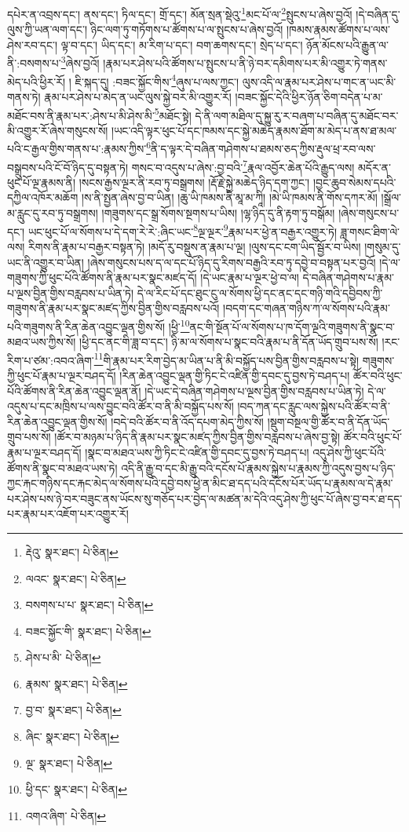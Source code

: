 དཔེར་ན་འབྲས་དང་། ནས་དང་། ཏིལ་དང་། གྲོ་དང་། མོན་སྲན་སྡེའུ་\footnote{རྡེའུ་  སྣར་ཐང་།  པེ་ཅིན། }མང་པོ་ལ་\footnote{ལའང་  སྣར་ཐང་།  པེ་ཅིན། }སྤུངས་པ་ཞེས་བྱའོ། །དེ་བཞིན་དུ་ལུས་ཀྱི་ཡན་ལག་དང་། ཉིང་ལག་ཏུ་གཏོགས་པ་ཚོགས་པ་ལ་སྤུངས་པ་ཞེས་བྱའོ། །ཁམས་རྣམས་ཚོགས་པ་ལས་ཤེས་རབ་དང་། ལྟ་བ་དང་། ཡིད་དང་། མ་རིག་པ་དང་། བག་ཆགས་དང་། སྲེད་པ་དང་། ཉོན་མོངས་པའི་རྒྱུན་ལ་ནི་:བསགས་པ་\footnote{བསགས་པ་པ་  སྣར་ཐང་།  པེ་ཅིན། }ཞེས་བྱའོ། །རྣམ་པར་ཤེས་པའི་ཚོགས་པ་སྤུངས་པ་ནི་ཉེ་བར་དམིགས་པར་མི་འགྱུར་ཏེ་གནས་མེད་པའི་ཕྱིར་རོ། །
ཇི་སྐད་དུ། :བཟང་སྐྱོང་གིས་\footnote{བཟང་སྐྱོང་གི་  སྣར་ཐང་།  པེ་ཅིན། }ཞུས་པ་ལས་ཀྱང་། ལུས་འདི་ལ་རྣམ་པར་ཤེས་པ་གང་ན་ཡང་མི་གནས་ཏེ། རྣམ་པར་ཤེས་པ་མེད་ན་ཡང་ལུས་སྐྱེ་བར་མི་འགྱུར་རོ། །བཟང་སྐྱོང་དེའི་ཕྱིར་ཉོན་ཅིག་བདེན་པ་མ་མཐོང་བས་ནི་རྣམ་པར་:ཤེས་པ་མི་ཤེས་མི་\footnote{ཤེས་པ་མི་  པེ་ཅིན། }མཐོང་སྟེ། དེ་ནི་ལག་མཐིལ་དུ་སྐྱུ་རུ་ར་བཞག་པ་བཞིན་དུ་མཐོང་བར་མི་འགྱུར་རོ་ཞེས་གསུངས་སོ། །ཡང་འདི་ལྟར་ཕུང་པོ་དང་ཁམས་དང་སྐྱེ་མཆེད་རྣམས་ཐོག་མ་མེད་པ་ནས་ཐ་མལ་པའི་ང་རྒྱལ་གྱིས་གནས་པ་:རྣམས་ཀྱིས་\footnote{རྣམས་  སྣར་ཐང་།  པེ་ཅིན། }ནི་ད་ལྟར་དེ་བཞིན་གཤེགས་པ་ཐམས་ཅད་ཀྱིས་རྡུལ་ཕྲ་རབ་ལས་བསྒྲུབས་པའི་ངོ་བོ་ཉིད་དུ་བསྟན་ཏེ། གསང་བ་འདུས་པ་ཞེས་:བྱ་བའི་\footnote{བྱ་བ་  སྣར་ཐང་།  པེ་ཅིན། }རྣལ་འབྱོར་ཆེན་པོའི་རྒྱུད་ལས། མདོར་ན་ཕུང་པོ་ལྔ་རྣམས་ནི། །སངས་རྒྱས་ལྔར་ནི་རབ་ཏུ་བསྒྲགས། །རྡོ་རྗེ་སྐྱེ་མཆེད་ཉིད་དག་ཀྱང་། །བྱང་ཆུབ་སེམས་དཔའི་དཀྱིལ་འཁོར་མཆོག །ས་ནི་སྤྱན་ཞེས་བྱ་བ་ཡིན། །ཆུ་ཡི་ཁམས་ནི་མཱ་མ་ཀཱི། །མེ་ཡི་ཁམས་ནི་གོས་དཀར་མོ། །སྒྲོལ་མ་རླུང་དུ་རབ་ཏུ་བསྒྲགས། །གཟུགས་དང་སྒྲ་སོགས་སྔགས་པ་ཡིས། །ལྷ་ཉིད་དུ་ནི་རྟག་ཏུ་བསྒོམ། །ཞེས་གསུངས་པ་དང་། ཡང་ཕུང་པོ་ལ་སོགས་པ་དེ་དག་རེ་རེ་:ཞིང་ཡང་\footnote{ཞིང་  སྣར་ཐང་།  པེ་ཅིན། }ལྔ་ལྔར་\footnote{ལྔ་  སྣར་ཐང་།  པེ་ཅིན། }རྣམ་པར་ཕྱེ་ན་བརྒྱར་འགྱུར་ཏེ། ཟླ་གསང་ཐིག་ལེ་ལས། རིགས་ནི་རྣམ་པ་བརྒྱར་བསྟན་ཏེ། །མདོ་རུ་བསྡུས་ན་རྣམ་པ་ལྔ། །ལུས་དང་ངག་ཡིད་སྦྱོར་བ་ཡིས། །གསུམ་དུ་ཡང་ནི་འགྱུར་བ་ཡིན། །ཞེས་གསུངས་པས་ད་ལ་དང་པོ་ཉིད་དུ་རིགས་བརྒྱའི་རབ་ཏུ་དབྱེ་བ་བསྟན་པར་བྱའོ། །དེ་ལ་གཟུགས་ཀྱི་ཕུང་པོའི་ཚོགས་ནི་རྣམ་པར་སྣང་མཛད་དོ། །དེ་ཡང་རྣམ་པ་ལྔར་ཕྱེ་བ་ལ། དེ་བཞིན་གཤེགས་པ་རྣམ་པ་ལྔས་བྱིན་གྱིས་བརླབས་པ་ཡིན་ཏེ། དེ་ལ་རིང་པོ་དང་ཐུང་ངུ་ལ་སོགས་ཕྱི་དང་ནང་དང་གཉི་གའི་དབྱིབས་ཀྱི་གཟུགས་ནི་རྣམ་པར་སྣང་མཛད་ཀྱིས་བྱིན་གྱིས་བརླབས་པའོ། །བདག་དང་གཞན་གཉིས་ཀ་ལ་སོགས་པའི་རྣམ་པའི་གཟུགས་ནི་རིན་ཆེན་འབྱུང་ལྡན་གྱིས་སོ། །ཕྱི་\footnote{ཕྱི་དང་  སྣར་ཐང་།  པེ་ཅིན། }ནང་གི་སྔོན་པོ་ལ་སོགས་པ་ཁ་དོག་ལྔའི་གཟུགས་ནི་སྣང་བ་མཐའ་ཡས་ཀྱིས་སོ། །ཕྱི་དང་ནང་གི་ཟླ་བ་དང་། ཉི་མ་ལ་སོགས་པ་སྣང་བའི་རྣམ་པ་ནི་དོན་ཡོད་གྲུབ་པས་སོ། །རང་རིག་པ་ཙམ་:འབའ་ཞིག་\footnote{འགའ་ཞིག་  པེ་ཅིན། }གི་རྣམ་པར་རིག་བྱེད་མ་ཡིན་པ་ནི་མི་བསྐྱོད་པས་བྱིན་གྱིས་བརླབས་པ་སྟེ། གཟུགས་ཀྱི་ཕུང་པོ་རྣམ་པ་ལྔར་བཤད་དོ། །རིན་ཆེན་འབྱུང་ལྡན་གྱི་ཏིང་ངེ་འཛིན་གྱི་དབང་དུ་བྱས་ཏེ་བཤད་པ། ཚོར་བའི་ཕུང་པོའི་ཚོགས་ནི་རིན་ཆེན་འབྱུང་ལྡན་ནོ། །དེ་ཡང་དེ་བཞིན་གཤེགས་པ་ལྔས་བྱིན་གྱིས་བརླབས་པ་ཡིན་ཏེ། དེ་ལ་འདུས་པ་དང་མཁྲིས་པ་ལས་བྱུང་བའི་ཚོར་བ་ནི་མི་བསྐྱོད་པས་སོ། །བད་ཀན་དང་རླུང་ལས་སྐྱེས་པའི་ཚོར་བ་ནི་རིན་ཆེན་འབྱུང་ལྡན་གྱིས་སོ། །བདེ་བའི་ཚོར་བ་ནི་འོད་དཔག་མེད་ཀྱིས་སོ། །སྡུག་བསྔལ་གྱི་ཚོར་བ་ནི་དོན་ཡོད་གྲུབ་པས་སོ། །ཚོར་བ་མཉམ་པ་ཉིད་ནི་རྣམ་པར་སྣང་མཛད་ཀྱིས་བྱིན་གྱིས་བརླབས་པ་ཞེས་བྱ་སྟེ། ཚོར་བའི་ཕུང་པོ་རྣམ་པ་ལྔར་བཤད་དོ། །སྣང་བ་མཐའ་ཡས་ཀྱི་ཏིང་ངེ་འཛིན་གྱི་དབང་དུ་བྱས་ཏེ་བཤད་པ། འདུ་ཤེས་ཀྱི་ཕུང་པོའི་ཚོགས་ནི་སྣང་བ་མཐའ་ཡས་ཏེ། འདི་ནི་རྒྱུ་བ་དང་མི་རྒྱུ་བའི་དངོས་པོ་རྣམས་སྐྱེས་པ་རྣམས་ཀྱི་འདུས་བྱས་པ་ཉིད་ཀྱང་རྐང་གཉིས་དང་རྐང་མེད་ལ་སོགས་པའི་དབྱེ་བས་ཕྱེ་ན་མིང་ཐ་དད་པའི་དངོས་པོར་ཡོད་པ་རྣམས་ལ་དེ་རྣམ་པར་ཤེས་པས་ཉེ་བར་བཟུང་ནས་ཡོངས་སུ་གཅོད་པར་བྱེད་ལ་མཚན་མ་དེའི་འདུ་ཤེས་ཀྱི་ཕུང་པོ་ཞེས་བྱ་བར་ཐ་དད་པར་རྣམ་པར་འཇོག་པར་འགྱུར་རོ། 